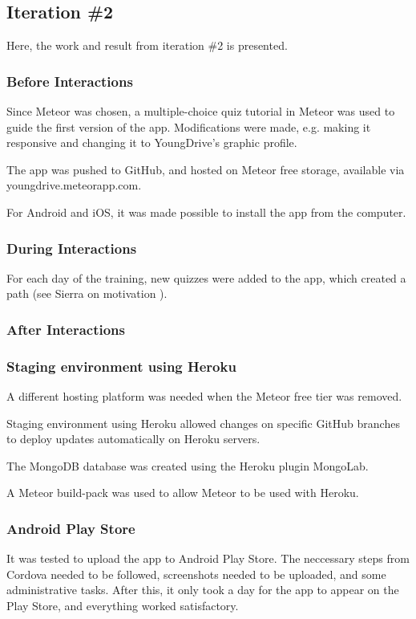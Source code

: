 \subsection{Iteration \#2}
Here, the work and result from iteration \#2 is presented.

\subsubsection{Before Interactions}

Since Meteor was chosen, a multiple-choice quiz tutorial in Meteor was used to guide the first version of the app. Modifications were made, e.g. making it responsive and changing it to YoungDrive's graphic profile.

The app was pushed to GitHub, and hosted on Meteor free storage, available via youngdrive.meteorapp.com.

For Android and iOS, it was made possible to install the app from the computer.

\subsubsection{During Interactions}
For each day of the training, new quizzes were added to the app, which created a path (see Sierra on motivation \citep{sierra}).

\subsubsection{After Interactions}

\subsubsection{Staging environment using Heroku}
A different hosting platform was needed when the Meteor free tier was removed.

Staging environment using Heroku allowed changes on specific GitHub branches to deploy updates automatically on Heroku servers.

The MongoDB database was created using the Heroku plugin MongoLab.

A Meteor build-pack was used to allow Meteor to be used with Heroku.

\subsubsection{Android Play Store}
It was tested to upload the app to Android Play Store. The neccessary steps from Cordova needed to be followed, screenshots needed to be uploaded, and some administrative tasks. After this, it only took a day for the app to appear on the Play Store, and everything worked satisfactory.

